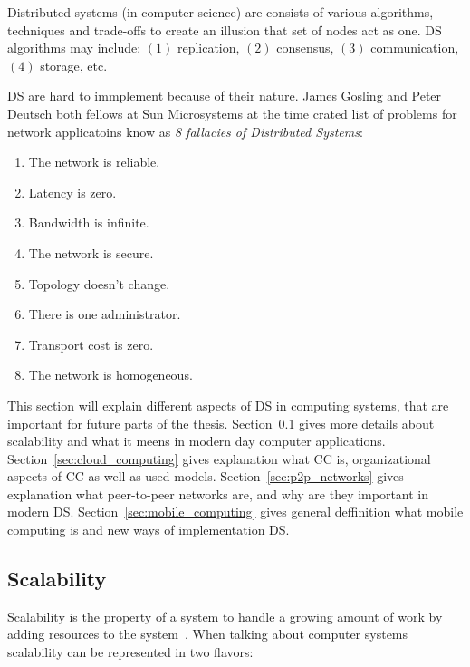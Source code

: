 Distributed systems (in computer science) are consists of various algorithms, techniques and trade-offs to create an illusion that set of nodes act as one. DS algorithms may include: $(1)$ replication, $(2)$ consensus, $(3)$ communication, $(4)$ storage, etc.

DS are hard to immplement because of their nature. James Gosling and Peter Deutsch both fellows at Sun Microsystems at the time crated list of problems for network applicatoins know as \textit{8 fallacies of Distributed Systems}:\label{enum:fallacies}

\begin{enumerate}[start=1,label={(\bfseries \arabic*)}]
	\item The network is reliable.
	\item Latency is zero.
	\item Bandwidth is infinite.
	\item The network is secure.
	\item Topology doesn't change.
	\item There is one administrator.
	\item Transport cost is zero.
	\item The network is homogeneous. 
\end{enumerate}

This section will explain different aspects of DS in computing systems, that are important for future parts of the thesis. Section~\ref{sec:scalability} gives more details about scalability and what it meens in modern day computer applications. Section~\ref{sec:cloud_computing} gives explanation what CC is, organizational aspects of CC as well as used models. Section~\ref{sec:p2p_networks} gives explanation what peer-to-peer networks are, and why are they important in modern DS. Section~\ref{sec:mobile_computing} gives general deffinition what mobile computing is and new ways of implementation DS.
%
%
\subsection{Scalability}\label{sec:scalability}
%
Scalability is the property of a system to handle a growing amount of work by adding resources to the system~\cite{Bondi00}. When talking about computer systems scalability can be represented in two flavors:

